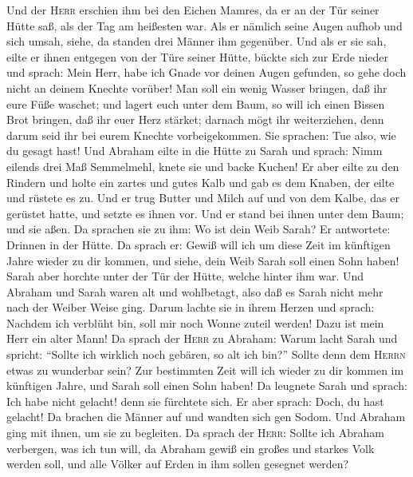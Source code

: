  Und der \textsc{Herr} erschien ihm bei den Eichen Mamres,
da er an der Tür seiner Hütte saß, als der Tag am heißesten war.
 Als er nämlich seine Augen aufhob und sich umsah, siehe,
da standen drei Männer ihm gegenüber. Und als er sie sah, eilte er ihnen
entgegen von der Türe seiner Hütte, bückte sich zur Erde nieder
 und sprach: Mein Herr, habe ich Gnade vor deinen Augen
gefunden, so gehe doch nicht an deinem Knechte vorüber! 
Man soll ein wenig Wasser bringen, daß ihr eure Füße waschet; und lagert
euch unter dem Baum,  so will ich einen Bissen Brot
bringen, daß ihr euer Herz stärket; darnach mögt ihr weiterziehen, denn
darum seid ihr bei eurem Knechte vorbeigekommen. Sie sprachen: Tue also,
wie du gesagt hast!  Und Abraham eilte in die Hütte zu
Sarah und sprach: Nimm eilends drei Maß Semmelmehl, knete sie und backe
Kuchen!  Er aber eilte zu den Rindern und holte ein zartes
und gutes Kalb und gab es dem Knaben, der eilte und rüstete es zu.
 Und er trug Butter und Milch auf und von dem Kalbe, das
er gerüstet hatte, und setzte es ihnen vor. Und er stand bei ihnen unter
dem Baum; und sie aßen.  Da sprachen sie zu ihm: Wo ist
dein Weib Sarah? Er antwortete: Drinnen in der Hütte.  Da
sprach er: Gewiß will ich um diese Zeit im künftigen Jahre wieder zu dir
kommen, und siehe, dein Weib Sarah soll einen Sohn haben! Sarah aber
horchte unter der Tür der Hütte, welche hinter ihm war. 
Und Abraham und Sarah waren alt und wohlbetagt, also daß es Sarah nicht
mehr nach der Weiber Weise ging.  Darum lachte sie in
ihrem Herzen und sprach: Nachdem ich verblüht bin, soll mir noch Wonne
zuteil werden! Dazu ist mein Herr ein alter Mann!  Da
sprach der \textsc{Herr} zu Abraham: Warum lacht Sarah und spricht:
``Sollte ich wirklich noch gebären, so alt ich bin?'' 
Sollte denn dem \textsc{Herrn} etwas zu wunderbar sein? Zur bestimmten
Zeit will ich wieder zu dir kommen im künftigen Jahre, und Sarah soll
einen Sohn haben!  Da leugnete Sarah und sprach: Ich habe
nicht gelacht! denn sie fürchtete sich. Er aber sprach: Doch, du hast
gelacht!  Da brachen die Männer auf und wandten sich gen
Sodom. Und Abraham ging mit ihnen, um sie zu begleiten. 
Da sprach der \textsc{Herr}: Sollte ich Abraham verbergen, was ich tun
will,  da Abraham gewiß ein großes und starkes Volk
werden soll, und alle Völker auf Erden in ihm sollen gesegnet werden?
